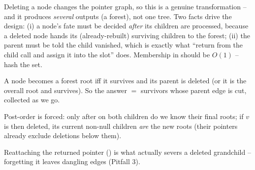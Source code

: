 Deleting a node changes the pointer graph, so this is a genuine transformation --
and it produces \emph{several} outputs (a forest), not one tree. Two facts drive
the design: (i) a node's fate must be decided \emph{after} its children are
processed, because a deleted node hands its (already-rebuilt) surviving children
to the forest; (ii) the parent must be told the child vanished, which is exactly
what ``return  from the child call and assign it into the slot''
does. Membership in  should be $O(1)$ -- hash the set.

\begin{observation}
A node becomes a forest root iff it survives and its parent is deleted (or it is
the overall root and survives). So the answer $=$ survivors whose parent edge is
cut, collected as we go.
\end{observation}
\begin{observation}
Post-order is forced: only after  on both children do we know their
final roots; if $v$ is then deleted, its current non-null children \emph{are} the
new roots (their pointers already exclude deletions below them).
\end{observation}
\begin{observation}
Reattaching the returned pointer () is what actually
severs a deleted grandchild -- forgetting it leaves dangling edges (Pitfall 3).
\end{observation}

\begin{thinkbox}
\end{thinkbox}

